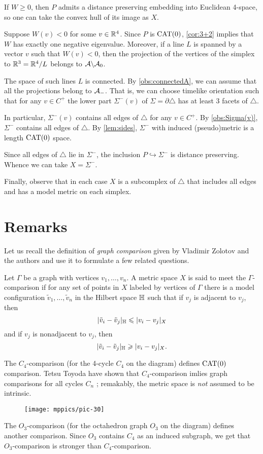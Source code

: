 \documentclass{article}
\begin{document}
If $W\ge0$, then $P$ admits a distance preserving embedding into Euclidean 4-space, so one can take the convex hull of its image as $X$.

Suppose $W(v)<0$ for some $v\in\mathbb{R}^4$.
Since $P$ is $\mathrm{CAT}(0)$, \ref{cor:3+2} implies that $W$ has exactly one negative eigenvalue.
Moreover, if a line $L$ is spanned by a vector $v$ such that $W(v)<0$, then the projection of the vertices of the simplex to $\mathbb{R}^3=\mathbb{R}^4/L$ belongs to $\mathcal{A}\backslash\mathcal{A}_0$.

The space of such lines $L$ is connected.
By \ref{obs:connectedA}, we can assume that all the projections belong to $\mathcal{A}_-$.
That is, we can choose timelike orientation such that for any $v\in C^+$ the lower part $\Sigma^-(v)$ of $\Sigma=\partial \triangle$ has at least 3 facets of $\triangle$.

In particular, $\Sigma^-(v)$ contains all edges of $\triangle$ for any $v\in C^+$.
By \ref{obs:Sigma(v)}, $\Sigma^-$ contains all edges of $\triangle$.
By \ref{lem:sides}, $\Sigma^-$ with induced (pseudo)metric is a length $\mathrm{CAT}(0)$ space.

Since all edges of $\triangle$ lie in $\Sigma^-$, the inclusion $P\hookrightarrow \Sigma^-$ is distance preserving.
Whence we can take $X=\Sigma^-$.

Finally, observe that in each case $X$ is a subcomplex of $\triangle$ that includes all edges and has a model metric on each simplex.
\qeds

\section{Remarks}

Let us recall the definition of \emph{graph comparison} given by Vladimir Zolotov and the authors \cite{lebedeva-petrunin-zolotov} and use it to formulate a few related questions.

Let $\Gamma$ be a graph with vertices $v_1,\dots,v_n$.
A metric space $X$ is said to meet the $\Gamma$-comparison if for any set of points in $X$ labeled by vertices of $\Gamma$ there is a model configuration $\tilde v_1,\dots,\tilde v_n$ in the Hilbert space $\mathbb H$ such that 
if $v_j$ is adjacent to $v_j$, then
\[|\tilde v_i-\tilde v_j|_{\mathbb H}\leqslant | v_i-v_j|_{X}\]
and
if $v_j$ is nonadjacent to $v_j$, then
\[|\tilde v_i-\tilde v_j|_{\mathbb H}\geqslant | v_i-v_j|_{X}.\]

The $C_4$-comparison (for the 4-cycle $C_4$ on the diagram) defines $\mathrm{CAT}(0)$ comparison.
Tetsu Toyoda have shown that $C_4$-comparison imlies graph comparisons for all cycles $C_n$ \cite{toyoda2020}; remakably, the metric space is \emph{not} assumed to be intrinsic. 
\begin{figure}[ht!]
\vskip-0mm
\centering
\texttt{[image: mppics/pic-30]}
\end{figure}
The $O_3$-comparison (for the octahedron graph $O_3$ on the diagram) defines another comparison.
Since $O_3$ contains $C_4$ as an induced subgraph, we get that $O_3$-comparison is stronger than $C_4$-comparison.
\end{document}
